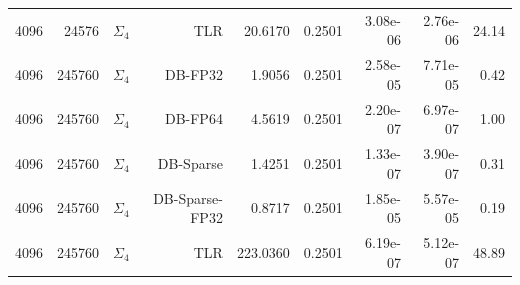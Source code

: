\begin{tabular}{|r|r|r|r|r|r|r|r|r|}
  4096 & 24576 & $\Sigma_4$ & TLR & 20.6170 & 0.2501 & 3.08e-06 & 2.76e-06 & 24.14 \\
  4096 & 245760 & $\Sigma_4$ & DB-FP32 & 1.9056 & 0.2501 & 2.58e-05 & 7.71e-05 & 0.42 \\
  4096 & 245760 & $\Sigma_4$ & DB-FP64 & 4.5619 & 0.2501 & 2.20e-07 & 6.97e-07 & 1.00 \\
  4096 & 245760 & $\Sigma_4$ & DB-Sparse & 1.4251 & 0.2501 & 1.33e-07 & 3.90e-07 & 0.31 \\
  4096 & 245760 & $\Sigma_4$ & DB-Sparse-FP32 & 0.8717 & 0.2501 & 1.85e-05 & 5.57e-05 & 0.19 \\
  4096 & 245760 & $\Sigma_4$ & TLR & 223.0360 & 0.2501 & 6.19e-07 & 5.12e-07 & 48.89 \\
  \hline
\end{tabular}
